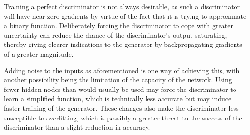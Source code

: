 \documentclass[../../main.tex]{subfiles}
\begin{document}
Training a perfect discriminator is not always desirable, as such a discriminator will have near-zero gradients by virtue of the fact that it is trying to approximate a binary function.
Deliberately forcing the discriminator to cope with greater uncertainty can reduce the chance of the discriminator's output saturating, thereby giving clearer indications to the generator by backpropagating gradients of a greater magnitude.

Adding noise to the inputs as aforementioned is one way of achieving this, with another possibility being the limitation of the capacity of the network.
Using fewer hidden nodes than would usually be used may force the discriminator to learn a simplified function, which is technically less accurate but may induce faster training of the generator.
These changes also make the discriminator less susceptible to overfitting, which is possibly a greater threat to the success of the discriminator than a slight reduction in accuracy.
\end{document}
